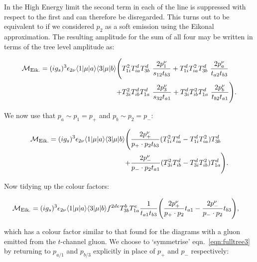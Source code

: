 		In the High Energy limit the second term in each of the line is suppressed with respect to the
		first and can therefore be disregarded.  This turns out to be equivalent to if we considered
		$p_2$ as a soft emission using the Eikonal approximation.  The resulting amplitude for the sum
		of all four may be written in terms of the tree level amplitude as:

		\begin{align}
		\begin{split}
		    \mathcal{M}_{\text{Eik.}} = (ig_s)^3 \epsilon_{2\nu} \bk{1}{\mu}{a} \bk{3}{\mu}{b} \Bigg(
		     &T^2_{1i}T^d_{ia}T^d_{3b}\ \frac{2p_1^\nu}{s_{12}t_{b3}}
		    + T^d_{1i}T^2_{ia}T^d_{3b}\ \frac{2p_a^\nu}{t_{a2}t_{b3}} \\
		    +&T^2_{3i}T^d_{ib}T^d_{1a}\ \frac{2p_3^\nu}{s_{32}t_{a1}}
		    + T^d_{3i}T^2_{ib}T^d_{1a}\ \frac{2p_b^\nu}{t_{b2}t_{a1}}\Bigg).
			\label{eq:fulltree2}
		\end{split}
		\end{align}

		We now use that $p_a\sim p_1=p_+$ and $p_b\sim p_2=p_-$:

		\begin{align}
		\begin{split}
			\mathcal{M}_{\text{Eik.}} = (ig_s)^3 \epsilon_{2\nu} \langle 1 | \mu | a \rangle \langle 3 | \mu | b \rangle \Bigg(&
			\frac{2p_+^\nu}{p_+\cdot p_2 t_{b3}}(T^2_{1i}T^d_{ia} - T^d_{1i}T^2_{ia})T^d_{3b}\\
			+ &\frac{2p_-^\nu}{p_-\cdot p_2 t_{a1}}(T^2_{3i}T^d_{ib} - T^d_{3i}T^2_{ib})T^d_{1a}\Bigg).\\
		\end{split}
		\end{align}

		Now tidying up the colour factors:

		\begin{align}
		\begin{split}
			\mathcal{M}_{\text{Eik.}} = (ig_s)^3 \epsilon_{2\nu} \langle 1 | \mu | a \rangle \langle 3 | \mu | b \rangle
			f^{2de}T^b_{3b}T^e_{1a}\frac{1}{t_{a1}t_{b3}}\Bigg(&
			\frac{2p_+^\nu}{p_+\cdot p_2}t_{a1} - \frac{2p_-^\nu}{p_-\cdot p_2}t_{b3}\Bigg),
			\label{eq:fulltree3}
		\end{split}
		\end{align}

		which has a colour factor similar to that found for the diagrams with a gluon emitted from the
		$t$-channel gluon.  We choose to `symmetrise' eqn.~\eqref{eqn:fulltree3} by returning to $p_{a/1}$
		and $p_{b/3}$ explicitly in place of $p_+$ and $p_-$ respectively:

